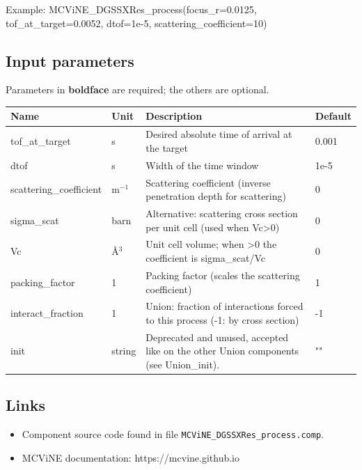 Example: MCViNE\_DGSSXRes\_process(focus\_r=0.0125, tof\_at\_target=0.0052, dtof=1e-5, scattering\_coefficient=10)

\subsection*{Input parameters}
Parameters in \textbf{boldface} are required; the others are optional.

\begin{longtable}{p{}p{}p{}p{}}
\toprule
\textbf{Name} & \textbf{Unit} & \textbf{Description} & \textbf{Default} \\
\midrule
\endhead
tof\_at\_target & s & Desired absolute time of arrival at the target & 0.001 \\
dtof & s & Width of the time window & 1e-5 \\
scattering\_coefficient & m$^{-1}$ & Scattering coefficient (inverse penetration depth for scattering) & 0 \\
sigma\_scat & barn & Alternative: scattering cross section per unit cell (used when Vc\textgreater{}0) & 0 \\
Vc & \AA{}$^{3}$ & Unit cell volume; when \textgreater{}0 the coefficient is sigma\_scat/Vc & 0 \\
packing\_factor & 1 & Packing factor (scales the scattering coefficient) & 1 \\
interact\_fraction & 1 & Union: fraction of interactions forced to this process (-1: by cross section) & -1 \\
init & string & Deprecated and unused, accepted like on the other Union components (see Union\_init). & "" \\
\bottomrule
\end{longtable}

\subsection*{Links}
\begin{itemize}
  \item Component source code found in file \texttt{MCViNE\_DGSSXRes\_process.comp}.
  \item MCViNE documentation: https://mcvine.github.io
\end{itemize}
